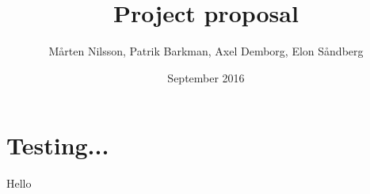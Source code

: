 \documentclass{article}
\title{Project proposal}
\author{ Mårten Nilsson, Patrik Barkman, Axel Demborg, Elon Såndberg}
\date{September 2016}
\begin{document}
\maketitle

\thispagestyle{empty}


\section{Testing...}
Hello
\end{document}
